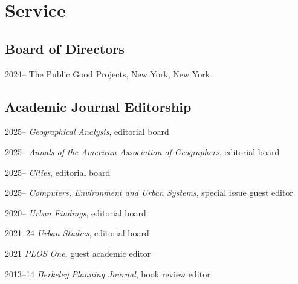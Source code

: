 \documentclass[11pt,letterpaper]{report} %
\begin{document}
    \section*{Service}

    \subsection*{Board of Directors}

    \begin{tablist}

       \item[2024--]    \tab{}The Public Good Projects, New York, New York

    \end{tablist}

    \subsection*{Academic Journal Editorship}

    \begin{tablist}

        \item[2025--]   \tab{}\textit{Geographical Analysis}, editorial board
        \item[2025--]   \tab{}\textit{Annals of the American Association of Geographers}, editorial board
        \item[2025--]   \tab{}\textit{Cities}, editorial board
        \item[2025--]   \tab{}\textit{Computers, Environment and Urban Systems}, special issue guest editor
        \item[2020--]   \tab{}\textit{Urban Findings}, editorial board
        \item[2021--24] \tab{}\textit{Urban Studies}, editorial board
        \item[2021]     \tab{}\textit{PLOS One}, guest academic editor
        \item[2013--14] \tab{}\textit{Berkeley Planning Journal}, book review editor

    \end{tablist}
\end{document}
